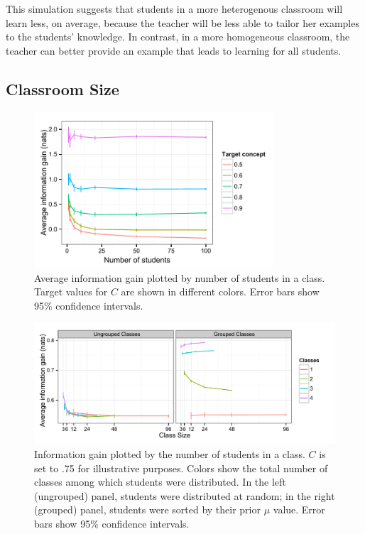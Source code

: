 \documentclass[10pt,letterpaper]{article}
\begin{document}
This simulation suggests that students in a more heterogenous classroom will learn less, on average, because the teacher will be less able to tailor her examples to the students' knowledge. In contrast, in a more homogeneous classroom, the teacher can better provide an example that leads to learning for all students. 

\subsection{Classroom Size}

\begin{figure}
\begin{center}
\includegraphics[width=3.5in]{figures/class_size.pdf}
\end{center}
\vspace{-2ex}
\caption{\label{fig:class} Average information gain plotted by number of students in a class. Target values for $C$ are shown in different colors. Error bars show 95\% confidence intervals.}
\vspace{-2ex}
\end{figure}



\begin{figure}
\begin{center}
\includegraphics[width=5.5in]{figures/grouping.pdf}
\end{center}
\vspace{-2ex}
\caption{\label{fig:grouping} Information gain plotted by the number of students in a class. $C$ is set to .75 for illustrative purposes. Colors show the total number of classes among which students were distributed. In the left (ungrouped) panel, students were distributed at random; in the right (grouped) panel, students were sorted by their prior $\mu$ value. Error bars show 95\% confidence intervals.}
\vspace{-2ex}
\end{figure}
\end{document}
